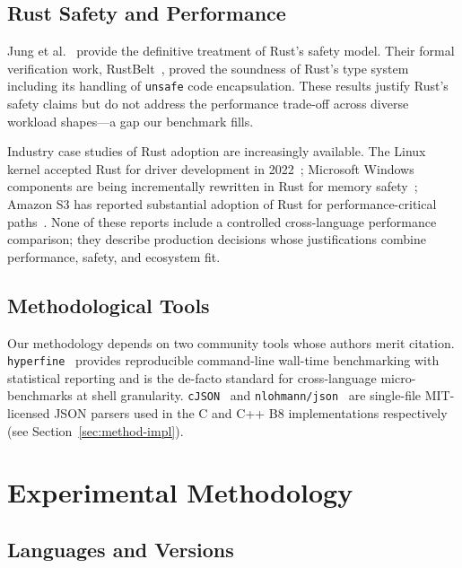 \documentclass[10pt,conference]{IEEEtran}
\begin{document}
\subsection{Rust Safety and Performance}

Jung et al.~\cite{jung2021safe} provide the definitive treatment of
Rust's safety model. Their formal verification work,
RustBelt~\cite{jung2018rustbelt}, proved the soundness of Rust's
type system including its handling of \texttt{unsafe} code
encapsulation. These results justify Rust's safety claims but do
not address the performance trade-off across diverse workload
shapes---a gap our benchmark fills.

Industry case studies of Rust adoption are increasingly available.
The Linux kernel accepted Rust for driver development in
2022~\cite{ojeda2022kernel}; Microsoft Windows components are
being incrementally rewritten in Rust for memory
safety~\cite{microsoft2023rust}; Amazon S3 has reported substantial
adoption of Rust for performance-critical
paths~\cite{amazon2024rust}. None of these reports include a
controlled cross-language performance comparison; they describe
production decisions whose justifications combine performance,
safety, and ecosystem fit.

\subsection{Methodological Tools}

Our methodology depends on two community tools whose authors merit
citation. \texttt{hyperfine}~\cite{hyperfine} provides reproducible
command-line wall-time benchmarking with statistical reporting and
is the de-facto standard for cross-language micro-benchmarks at
shell granularity. \texttt{cJSON}~\cite{cjson} and
\texttt{nlohmann/json}~\cite{nlohmannjson} are single-file MIT-licensed
JSON parsers used in the C and C++ B8 implementations respectively
(see Section~\ref{sec:method-impl}).

\section{Experimental Methodology}
\label{sec:method}

\subsection{Languages and Versions}
\end{document}
